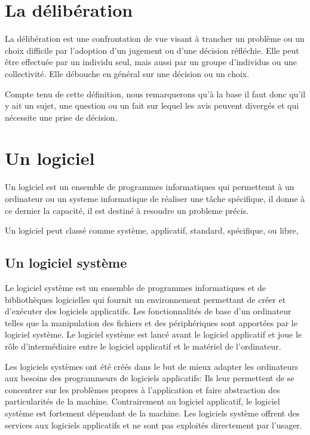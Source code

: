 \section{La délibération}\label{sec:deliberation}
La délibération est une confrontation de vue
visant à trancher un problème ou un choix difficile par l'adoption d'un
jugement ou d'une décision réfléchie. Elle peut être effectuée par un individu seul,
mais aussi par un groupe d'individus ou une collectivité. Elle débouche en général sur
une décision ou un choix.

Compte tenu de cette définition, nous remarquerons qu'à la base il faut donc qu'il y ait
un sujet, une question ou un fait sur lequel les avis peuvent divergés et qui nécessite
une prise de décision.
\section{Un logiciel}\label{sec:application}
Un logiciel est un ensemble de programmes informatiques qui
permettemt à un ordinateur ou un systeme informatique de réaliser une t\^ache spécifique,
il donne à ce dernier la capacité, il est destiné à resoudre un probleme précis.

Un logiciel peut classé comme système, applicatif, standard, spécifique, ou libre,

\subsection{Un logiciel système}\label{subsec:logiciel-systeme}
Le logiciel système est un ensemble de programmes informatiques et de bibliothèques logicielles
qui fournit un environnement permettant de créer et d'exécuter des logiciels applicatifs.
Les fonctionnalités de base d'un ordinateur telles que la manipulation des fichiers et
des périphériques sont apportées par le logiciel système. Le logiciel système est lancé avant le
logiciel applicatif et joue le rôle d'intermédiaire entre le logiciel applicatif et le matériel de
l'ordinateur.

Les logiciels systèmes ont été créés dans le but de mieux adapter les ordinateurs aux besoins des
programmeurs de logiciels applicatifs: Ils leur permettent de se concentrer sur les problèmes propres
à l'application et faire abstraction des particularités de la machine. Contrairement au logiciel
applicatif, le logiciel système est fortement dépendant de la machine. Les logiciels système offrent
des services aux logiciels applicatifs et ne sont pas exploités directement par l'usager.

